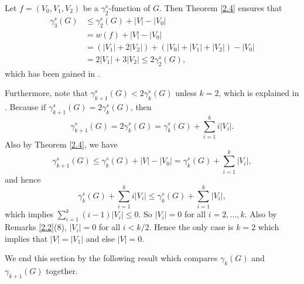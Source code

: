 \documentclass[12pt]{amsart}
\begin{document}
Let $f=(V_0,V_1, V_2)$ be a $\gamma_2^s$-function of $G$. Then Theorem \ref{2.4} ensures that
\begin{align*}
\gamma _3^s(G)&\leq \gamma_2^s(G)+|V|-|V_0|\\
&=w(f)+|V|-|V_0|\\
&=(|V_1|+2|V_2|)+(|V_0|+|V_1|+|V_2|)-|V_0|\\
&=2|V_1|+3|V_2|\leq 2\gamma _2^s(G),
\end{align*}
which has been gained in \cite[Proposition 2 and Corollary 3]{double}.

Furthermore, note that $\gamma_{k+1}^s(G)<2\gamma_k^s(G)$ unless $k=2$, which is explained in \cite[Corollary 3]{double}. Because if $\gamma_{k+1}^s(G)=2\gamma_k^s(G)$, then
$$\gamma_{k+1}^s(G)=2\gamma_k^s(G)=\gamma_k^s(G)+\sum_{i=1}^ki|V_i|.$$
Also by Theorem \ref{2.4}, we have 
$$\gamma_{k+1}^s(G)\leq \gamma_k^s(G)+|V|-|V_0|=\gamma_k^s(G)+\sum_{i=1}^k|V_i|,$$
and hence
$$\gamma_k^s(G)+\sum_{i=1}^ki|V_i|\leq \gamma_k^s(G)+\sum_{i=1}^k|V_i|,$$
which implies $\sum_{i=1}^k (i-1)|V_i|\leq 0$. So $|V_i|=0$ for all $i=2, \dots , k$. Also by Remarks \ref{2.2}(8), $|V_i|=0$ for all $i<k/2$. Hence the only case is $k=2$ which implies that $|V|=|V_1|$ and else $|V|=0$.

We end this section by the following result which compares $\gamma_k(G)$ and $\gamma_{k+1}(G)$ together.
\end{document}
